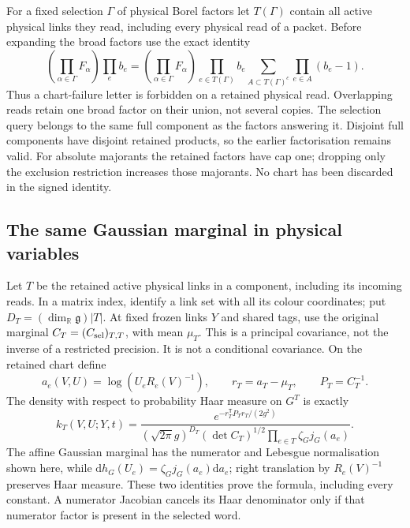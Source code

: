 \documentclass[11pt,reqno]{amsart}
\numberwithin{equation}{section}
\theoremstyle{definition}
\theoremstyle{remark}
\newcommand{\R}{\mathbb R}
\newcommand{\dd}{\mathrm d}
\newcommand{\g}{\mathfrak g}
\begin{document}
For a fixed selection \(\Gamma\) of physical Borel factors let
\(T(\Gamma)\) contain all active physical links they read,
including every physical read of a packet. Before expanding the
broad factors use the exact identity
\begin{equation}
 \left(\prod_{\alpha\in\Gamma}F_\alpha\right)\prod_e b_e
  =\left(\prod_{\alpha\in\Gamma}F_\alpha\right)
       \prod_{e\in T(\Gamma)}b_e
       \sum_{A\subset T(\Gamma)^c}\prod_{e\in A}(b_e-1).
 \label{eq:output-retained-chart-rule}
\end{equation}
Thus a chart-failure letter is forbidden on a retained physical
read. Overlapping reads retain one broad factor on their union,
not several copies. The selection query belongs to the same
full component as the factors answering it. Disjoint full
components have disjoint retained products, so the earlier
factorisation remains valid. For absolute majorants the retained
factors have cap one; dropping only the exclusion restriction
increases those majorants. No chart has been discarded in the
signed identity.

\subsection{The same Gaussian marginal in physical variables}

Let \(T\) be the retained active physical links in a component,
including its incoming reads. In a matrix index, identify a
link set with all its colour coordinates; put
\(D_T=(\dim_\R\g)|T|\). At fixed frozen links \(Y\) and shared
tags, use the original marginal
\(C_T=(C_{\rm sel})_{T,T}\), with mean \(\mu_T\).
This is a principal covariance, not the inverse of a restricted
precision. It is not a conditional covariance.
On the retained chart define
\[
 a_e(V,U)=\log(U_eR_e(V)^{-1}),\qquad
                  r_T=a_T-\mu_T,\qquad P_T=C_T^{-1}.
\]
The density with respect to probability Haar measure on \(G^T\)
is exactly
\begin{equation}
 k_T(V,U;Y,t)=
 \frac{e^{-r_T^{\mathsf T}P_Tr_T/(2g^2)}}
 {(\sqrt{2\pi}g)^{D_T}(\det C_T)^{1/2}
                     \prod_{e\in T}\zeta_Gj_G(a_e)}.
 \label{eq:output-physical-density}
\end{equation}
The affine Gaussian marginal has the numerator and Lebesgue
normalisation shown here, while
\(\dd h_G(U_e)=\zeta_Gj_G(a_e)\dd a_e\); right translation
by \(R_e(V)^{-1}\) preserves Haar measure. These two identities
prove the formula, including every constant. A numerator
Jacobian cancels its Haar denominator only if that numerator
factor is present in the selected word.
\end{document}
